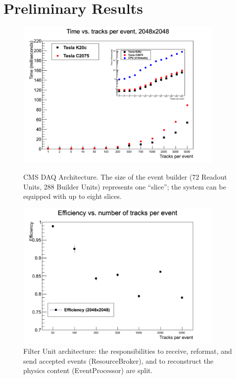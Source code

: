 \documentclass{JINST}
\begin{document}
\section{Preliminary Results}

\begin{figure}[!Hhtb]
\begin{minipage}[t]{8.0cm}
\begin{center}
	\includegraphics[width=0.9\textwidth]{figs/TimePerformance.pdf}
	\caption{CMS DAQ Architecture. The size  of the event builder (72 Readout
Units, 288  Builder Units) represents one “slice”; the  system can be equipped
with up to eight slices. \label{fig:hltarc}}
	\end{center}
\end{minipage}
\begin{minipage}[t]{8.0cm}
\begin{center}
	\includegraphics[width=0.9\textwidth]{figs/Eff.pdf}
	\caption{Filter Unit architecture: the responsibilities to receive, reformat, and
send accepted events (ResourceBroker), and to reconstruct the physics content
(EventProcessor) are split.  \label{fig:fu}}
	\end{center}
\end{minipage}
\end{figure}
\end{document}

